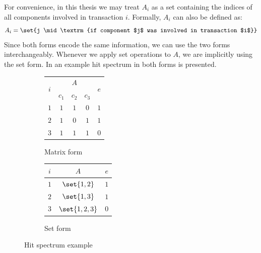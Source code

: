 For convenience, in this thesis we may treat $A_i$ as a set containing
the indices of all components involved in transaction $i$.
%
Formally, $A_i$ can also be defined as:
\begin{equation}
  A_{i} = \set{j \mid \textrm{if component $j$ was involved in transaction $i$}}
\end{equation}
%
Since both forms encode the same information, we can use the two forms
interchangeably.
%
Whenever we apply set operations to $A$, we are implicitly using the
set form.
%
In  an example hit
spectrum in both forms is presented.
\begin{figure}[ht]
  \begin{subfigure}{0.4\columnwidth}
    \begin{tabular}{c|ccc|c}
      \multirow{2}{*}{$i$} & \multicolumn{3}{c|}{$A$} & \multirow{2}{*}{$e$} \\
      \cline{2-4}
                           & $c_1$                    & $c_2$ & $c_3$ &      \\ \hline
      $1$                  & $1$                      & $1$   & $0$   & $1$  \\
      $2$                  & $1$                      & $0$   & $1$   & $1$  \\
      $3$                  & $1$                      & $1$   & $1$   & $0$  \\
    \end{tabular}
    \caption{Matrix form}
  \end{subfigure}
  \begin{subfigure}{0.4\columnwidth}
    \begin{tabular}{c|c|c}
      $i$                  & $A$                      & $e$                  \\\hline
      $1$                  & $\set{1,2}$              & $1$                  \\
      $2$                  & $\set{1,3}$              & $1$                  \\
      $3$                  & $\set{1,2,3}$            & $0$                  \\
    \end{tabular}
    \caption{Set form}
  \end{subfigure}
  \caption{Hit spectrum example\label{fig:intro:hit-spectrum-example}}
\end{figure}



